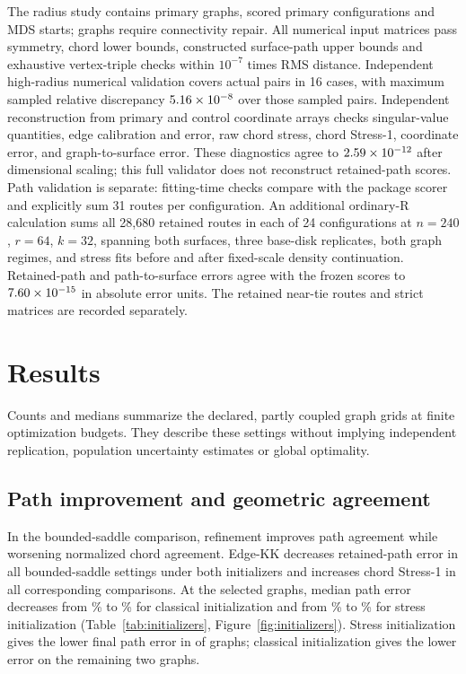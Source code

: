 \documentclass[11pt]{article}
\begin{document}
The radius study contains \numRadiusGraphs{} primary graphs, \numRadiusCandidates{} scored primary
configurations and \numRadiusStarts{} MDS starts; \numRepairedGraphs{} graphs require connectivity repair.
All \numInputMatrices{} numerical input matrices pass symmetry, chord lower bounds,
constructed surface-path upper bounds and exhaustive vertex-triple checks
within $10^{-7}$ times RMS distance. Independent high-radius numerical
validation covers \numValidationPairs{} actual pairs in 16 cases, with maximum sampled relative
discrepancy $5.16\times10^{-8}$ over those sampled pairs.
Independent reconstruction from \numValidatedCoordinates{} primary and control
coordinate arrays checks singular-value quantities, edge calibration and error,
raw chord stress, chord Stress-1, coordinate error, and graph-to-surface error.
These diagnostics agree to $2.59\times10^{-12}$ after dimensional scaling;
this full validator does not reconstruct retained-path scores.
Path validation is separate: fitting-time checks compare with the package
scorer and explicitly sum 31 routes per configuration. An additional ordinary-R
calculation sums all 28,680 retained routes in each of 24 configurations at
$n=240$, $r=64$, $k=32$, spanning both surfaces, three base-disk replicates,
both graph regimes, and stress fits before and after fixed-scale density
continuation. Retained-path and path-to-surface errors agree with the frozen
scores to $7.60\times10^{-15}$ in absolute error units.
The retained near-tie routes and strict matrices are recorded separately.

\section{Results}
Counts and medians summarize the declared, partly coupled graph grids at
finite optimization budgets. They describe these settings without implying
independent replication, population uncertainty estimates or global optimality.

\subsection{Path improvement and geometric agreement}
In the bounded-saddle comparison, refinement improves path agreement while
worsening normalized chord agreement. Edge-KK decreases
retained-path error in all \numBoundedGraphs{} bounded-saddle settings under
both initializers and increases chord Stress-1 in all corresponding comparisons.
At the selected graphs, median path error decreases from \numClassicalBefore\% to \numClassicalAfter\%
for classical initialization and from \numStressBefore\% to \numStressAfter\% for stress
initialization (Table~\ref{tab:initializers}, Figure~\ref{fig:initializers}).
Stress initialization gives the lower final path error in \numStressWins{} of \numBoundedGraphs{} graphs;
classical initialization gives the lower error on the remaining two graphs.
\end{document}
